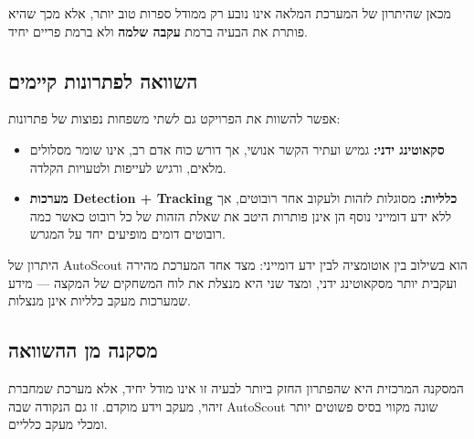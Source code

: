 מכאן שהיתרון של המערכת המלאה אינו נובע רק ממודל ספרות טוב יותר, אלא
מכך שהיא פותרת את הבעיה ברמת \textbf{עקבה שלמה} ולא ברמת פריים יחיד.

\subsection{השוואה לפתרונות קיימים}

אפשר להשוות את הפרויקט גם לשתי משפחות נפוצות של פתרונות:

\begin{itemize}
\item \textbf{סקאוטינג ידני:} גמיש ועתיר הקשר אנושי, אך דורש כוח אדם רב,
  אינו שומר מסלולים מלאים, ורגיש לעייפות ולטעויות הקלדה.

\item \textbf{מערכות \textenglish{Detection + Tracking} כלליות:} מסוגלות
  לזהות ולעקוב אחר רובוטים, אך ללא ידע דומייני נוסף הן אינן פותרות היטב
  את שאלת הזהות של כל רובוט כאשר כמה רובוטים דומים מופיעים יחד על
  המגרש.
\end{itemize}

היתרון של \textenglish{AutoScout} הוא בשילוב בין אוטומציה לבין ידע
דומייני: מצד אחד המערכת מהירה ועקבית יותר מסקאוטינג ידני, ומצד שני היא
מנצלת את לוח המשחקים של המקצה --- מידע שמערכות מעקב כלליות אינן מנצלות.

\subsection{מסקנה מן ההשוואה}

המסקנה המרכזית היא שהפתרון החזק ביותר לבעיה זו אינו מודל יחיד, אלא
מערכת שמחברת זיהוי, מעקב וידע מוקדם. זו גם הנקודה שבה \textenglish{AutoScout}
שונה מקווי בסיס פשוטים יותר ומכלי מעקב כלליים.
